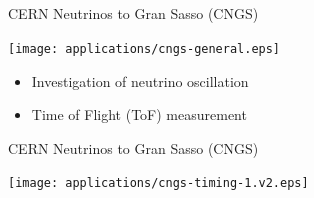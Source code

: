 \documentclass[compress,red]{beamer}
\begin{document}
\subsection{}
\begin{frame}{CERN Neutrinos to Gran Sasso (CNGS)}

    \begin{center}
      \texttt{[image: applications/cngs-general.eps]}
    \end{center}

    \begin{center}
      \begin{itemize}
	\item Investigation of neutrino oscillation
	\item Time of Flight (ToF) measurement
      \end{itemize}

    \end{center}


\end{frame}
\begin{frame}{CERN Neutrinos to Gran Sasso (CNGS)}

      \begin{center}
      
      \texttt{[image: applications/cngs-timing-1.v2.eps]} 
      \end{center}

\end{frame}
\end{document}

